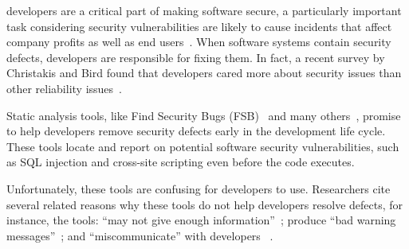 \documentclass[10pt,journal,compsoc]{IEEEtran}
\begin{document}
 developers are a critical part of making software secure, a particularly important task considering security vulnerabilities are likely to cause incidents that affect company profits as well as end users~\cite{chen2002mops}.
When software systems contain security defects, developers are responsible for fixing them. 
In fact, a recent survey by Christakis and Bird found that developers cared more about security issues than other reliability issues~\cite{christakis2016developers}.

Static analysis tools, like Find Security Bugs (FSB)~\cite{FindSecurityBugs} and many others~\cite{CodeAnalysis, OWASPSCA, SecurityAnalyzers, CodeSonar, Coverity}, promise to help developers remove security defects early in the development life cycle.
These tools locate and report on potential software security vulnerabilities, such as SQL injection and cross-site scripting even before the code executes.

Unfortunately, these tools are confusing for developers to use.
Researchers cite several related reasons why these tools do not help developers resolve defects, for instance, the tools: ``may not give enough information''~\cite{johnson2013don}; produce ``bad warning messages''~\cite{christakis2016developers}; and ``miscommunicate'' with developers ~\cite{johnson2016cross}.



%
\end{document}
